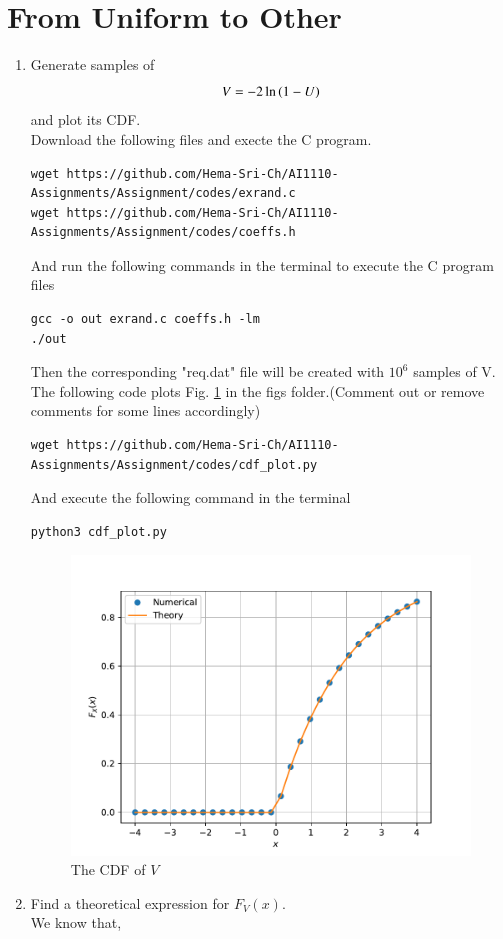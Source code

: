 \documentclass[journal,12pt,twocolumn]{article}
\renewcommand\thesection{\arabic{section}}
\begin{document}
\section{From Uniform to Other}
\begin{enumerate}[label=\thesection.\arabic*
,ref=\thesection.\theenumi]
%
\item
Generate samples of 
%
\begin{equation}
V = -2\ln\left(1-U\right)
\end{equation}
%
and plot its CDF.
\\  
\solution
Download the following files and execte the C program.
\begin{lstlisting}
wget https://github.com/Hema-Sri-Ch/AI1110-Assignments/Assignment/codes/exrand.c
wget https://github.com/Hema-Sri-Ch/AI1110-Assignments/Assignment/codes/coeffs.h
\end{lstlisting}
And run the following commands in the terminal to execute the C program files
\begin{lstlisting}
gcc -o out exrand.c coeffs.h -lm
./out
\end{lstlisting}
Then the corresponding "req.dat" file will be created with $10^6$ samples of V.
The following code plots Fig. \ref{fig:req_cdf} in the figs folder.(Comment out or remove comments for some lines accordingly)
\begin{lstlisting}
wget https://github.com/Hema-Sri-Ch/AI1110-Assignments/Assignment/codes/cdf_plot.py
\end{lstlisting}
And execute the following command in the terminal 
\begin{lstlisting}
python3 cdf_plot.py
\end{lstlisting}
\begin{figure}[h]
	\centering
	\includegraphics[width=\columnwidth]{req_cdf}
	\caption{The CDF of $V$}
	\label{fig:req_cdf}
\end{figure}
\item Find a theoretical expression for $F_V(x)$.
\\
\solution We know that,


\end{enumerate}
\end{document}
